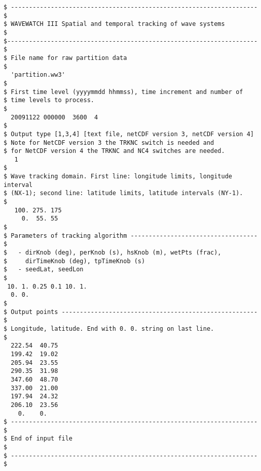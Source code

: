 \begin{footnotesize}
\begin{verbatim}
$ -------------------------------------------------------------------- $
$ WAVEWATCH III Spatial and temporal tracking of wave systems          $
$--------------------------------------------------------------------- $
$ File name for raw partition data
$
  'partition.ww3'
$
$ First time level (yyyymmdd hhmmss), time increment and number of 
$ time levels to process.
$
  20091122 000000  3600  4
$
$ Output type [1,3,4] [text file, netCDF version 3, netCDF version 4]
$ Note for NetCDF version 3 the TRKNC switch is needed and
$ for NetCDF version 4 the TRKNC and NC4 switches are needed.
   1
$
$ Wave tracking domain. First line: longitude limits, longitude interval
$ (NX-1); second line: latitude limits, latitude intervals (NY-1).
$
   100. 275. 175
     0.  55. 55
$
$ Parameters of tracking algorithm ----------------------------------- $
$   - dirKnob (deg), perKnob (s), hsKnob (m), wetPts (frac), 
$     dirTimeKnob (deg), tpTimeKnob (s)
$   - seedLat, seedLon
$
 10. 1. 0.25 0.1 10. 1.
  0. 0.
$
$ Output points ------------------------------------------------------ $
$ Longitude, latitude. End with 0. 0. string on last line.
$
  222.54  40.75
  199.42  19.02 
  205.94  23.55 
  290.35  31.98 
  347.60  48.70 
  337.00  21.00
  197.94  24.32
  206.10  23.56 
    0.    0.
$ -------------------------------------------------------------------- $
$ End of input file                                                    $
$ -------------------------------------------------------------------- $

\end{verbatim}
\end{footnotesize}
